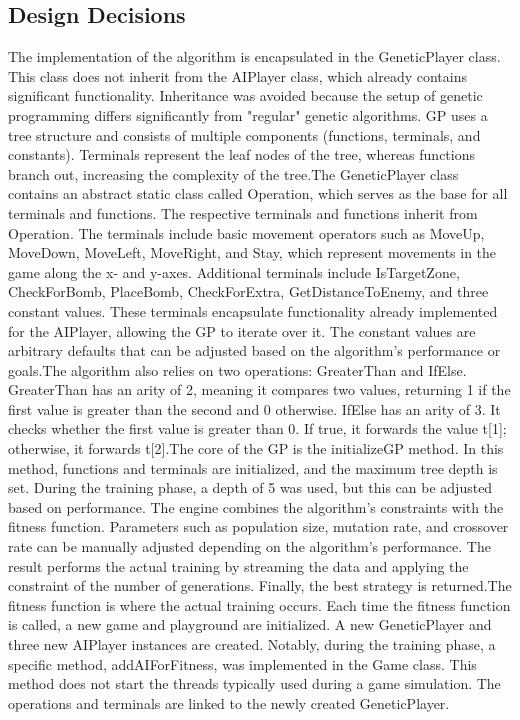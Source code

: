 \documentclass[sigconf]{acmart} %
\begin{document}
\subsection{Design Decisions}

The implementation of the algorithm is encapsulated in the GeneticPlayer class. This class does not inherit from the AIPlayer class, which already contains significant functionality. Inheritance was avoided because the setup of genetic programming differs significantly from "regular" genetic algorithms. GP uses a tree structure and consists of multiple components (functions, terminals, and constants). Terminals represent the leaf nodes of the tree, whereas functions branch out, increasing the complexity of the tree.The GeneticPlayer class contains an abstract static class called Operation, which serves as the base for all terminals and functions. The respective terminals and functions inherit from Operation. The terminals include basic movement operators such as MoveUp, MoveDown, MoveLeft, MoveRight, and Stay, which represent movements in the game along the x- and y-axes. Additional terminals include IsTargetZone, CheckForBomb, PlaceBomb, CheckForExtra, GetDistanceToEnemy, and three constant values. These terminals encapsulate functionality already implemented for the AIPlayer, allowing the GP to iterate over it. The constant values are arbitrary defaults that can be adjusted based on the algorithm's performance or goals.The algorithm also relies on two operations: GreaterThan and IfElse. GreaterThan has an arity of 2, meaning it compares two values, returning 1 if the first value is greater than the second and 0 otherwise. IfElse has an arity of 3. It checks whether the first value is greater than 0. If true, it forwards the value t[1]; otherwise, it forwards t[2].The core of the GP is the initializeGP method. In this method, functions and terminals are initialized, and the maximum tree depth is set. During the training phase, a depth of 5 was used, but this can be adjusted based on performance. The engine combines the algorithm's constraints with the fitness function. Parameters such as population size, mutation rate, and crossover rate can be manually adjusted depending on the algorithm's performance. The result performs the actual training by streaming the data and applying the constraint of the number of generations. Finally, the best strategy is returned.The fitness function is where the actual training occurs. Each time the fitness function is called, a new game and playground are initialized. A new GeneticPlayer and three new AIPlayer instances are created. Notably, during the training phase, a specific method, addAIForFitness, was implemented in the Game class. This method does not start the threads typically used during a game simulation. The operations and terminals are linked to the newly created GeneticPlayer. 
\end{document}
